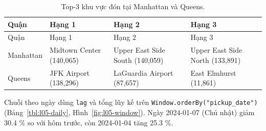 \documentclass[
  12pt,
  a4paper,
]{article}
\begin{document}
\begin{longtable}[]{@{}
  >{\raggedright\arraybackslash}p{}
  >{\raggedright\arraybackslash}p{}
  >{\raggedright\arraybackslash}p{}
  >{\raggedright\arraybackslash}p{}@{}}
\caption{\label{tbl:l05-top3}Top-3 khu vực đón tại Manhattan và
Queens.}\tabularnewline
\toprule\noalign{}
\begin{minipage}[b]{\linewidth}\raggedright
Quận
\end{minipage} & \begin{minipage}[b]{\linewidth}\raggedright
Hạng 1
\end{minipage} & \begin{minipage}[b]{\linewidth}\raggedright
Hạng 2
\end{minipage} & \begin{minipage}[b]{\linewidth}\raggedright
Hạng 3
\end{minipage} \\
\midrule\noalign{}
\endfirsthead
\toprule\noalign{}
\begin{minipage}[b]{\linewidth}\raggedright
Quận
\end{minipage} & \begin{minipage}[b]{\linewidth}\raggedright
Hạng 1
\end{minipage} & \begin{minipage}[b]{\linewidth}\raggedright
Hạng 2
\end{minipage} & \begin{minipage}[b]{\linewidth}\raggedright
Hạng 3
\end{minipage} \\
\midrule\noalign{}
\endhead
\bottomrule\noalign{}
\endlastfoot
Manhattan & Midtown Center (140,065) & Upper East Side South (140,059) &
Upper East Side North (133,891) \\
Queens & JFK Airport (138,296) & LaGuardia Airport (87,657) & East
Elmhurst (11,861) \\
\end{longtable}

Chuỗi theo ngày dùng \texttt{lag} và tổng lũy kế trên
\texttt{Window.}\allowbreak{}\texttt{orderBy("pickup\_}\allowbreak{}\texttt{date")}\allowbreak{}
(Bảng~\ref{tbl:l05-daily}, Hình~\ref{fig:l05-window}). Ngày 2024-01-07
(Chủ nhật) giảm 30.4 \% so với hôm trước, còn 2024-01-04 tăng 25.3 \%.
\end{document}
